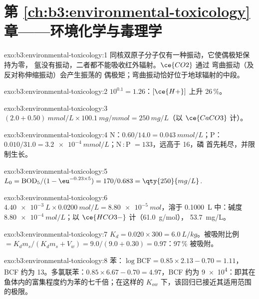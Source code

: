 \section*{第 \ref{ch:b3:environmental-toxicology} 章——环境化学与毒理学}

\begin{solution}{exo:b3:environmental-toxicology:1}
同核双原子分子仅有一种振动，它使偶极矩保持为零，
氩没有振动，二者都不能吸收红外辐射。$\ce{CO2}$ 通过
弯曲振动（及反对称伸缩振动）会产生振荡的
偶极矩；弯曲振动恰好位于地球辐射的中段。
\end{solution}

\begin{solution}{exo:b3:environmental-toxicology:2}
$10^{0.1} = 1.26$：$[\ce{H+}]$ 上升 26\,\%。
\end{solution}

\begin{solution}{exo:b3:environmental-toxicology:3}
$(2.0 + 0.50)\ \unit{mmol/L} \times \qty{100.1}{mg/mmol} = \qty{250}{mg/L}$（以 $\ce{CaCO3}$ 计）。
\end{solution}

\begin{solution}{exo:b3:environmental-toxicology:4}
N：$0.60/14.0 = \qty{0.043}{mmol/L}$；P：$0.010/31.0 = \qty{3.2e-4}{mmol/L}$；N\,:\,P $= 133$，远高于 16，磷
首先耗尽，并限制生长。
\end{solution}

\begin{solution}{exo:b3:environmental-toxicology:5}
$L_0 = \mathrm{BOD_5}/(1 - \eu^{-0.23 \times 5}) = 170/0.683 = \qty{250}{mg/L}$.
\end{solution}

\begin{solution}{exo:b3:environmental-toxicology:6}
$\qty{4.40e-3}{L} \times \qty{0.0200}{mol/L} = \qty{8.80e-5}{mol}$，溶于 \qty{0.1000}{L} 中：碱度 $\qty{8.80e-4}{mol/L}$；以 $\ce{HCO3-}$ 计（\qty{61.0}{g/mol}），
\qty{53.7}{mg/L}。
\end{solution}

\begin{solution}{exo:b3:environmental-toxicology:7}
$K_d = 0.020 \times 300 = \qty{6.0}{L/kg}$。被吸附比例 $= K_dm_s/(K_dm_s + V_w) = 9.0/(9.0 + 0.30) = 0.97$：97\,\% 被吸附。
\end{solution}

\begin{solution}{exo:b3:environmental-toxicology:8}
苯：$\log\mathrm{BCF} = 0.85 \times 2.13 - 0.70 = 1.11$，BCF 约为 13。多氯联苯：$0.85 \times 6.67 - 0.70 = 4.97$，BCF 约为
\num{9e4}：即其在鱼体内的富集程度约为苯的七千倍；在这样的
$K_{ow}$ 下，该回归已接近其适用范围的极限。
\end{solution}

